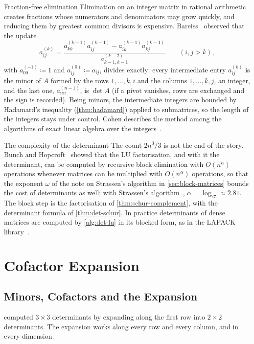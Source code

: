 \begin{note}{Fraction-free elimination}
Elimination on an integer matrix in rational arithmetic creates fractions whose numerators and denominators may grow quickly, and reducing them by greatest common divisors is expensive. Bareiss~\cite{bareiss1968} observed that the update
\[
a_{ij}^{(k)}=\frac{a_{kk}^{(k-1)}a_{ij}^{(k-1)}-a_{ik}^{(k-1)}a_{kj}^{(k-1)}}{a_{k-1,k-1}^{(k-2)}}\qquad(i,j>k),
\]
with $a_{00}^{(-1)}\coloneqq1$ and $a_{ij}^{(0)}\coloneqq a_{ij}$, divides exactly: every intermediate entry $a_{ij}^{(k)}$ is the minor of $A$ formed by the rows $1,\ldots,k,i$ and the columns $1,\ldots,k,j$, an integer, and the last one, $a_{nn}^{(n-1)}$, is $\det A$ (if a pivot vanishes, rows are exchanged and the sign is recorded). Being minors, the intermediate integers are bounded by Hadamard's inequality (\cref{thm:hadamard}) applied to submatrices, so the length of the integers stays under control. Cohen describes the method among the algorithms of exact linear algebra over the integers~\cite{cohen1993}.
\end{note}

\begin{note}{The complexity of the determinant}
The count $2n^3/3$ is not the end of the story. Bunch and Hopcroft~\cite{bunch1974} showed that the LU factorisation, and with it the determinant, can be computed by recursive block elimination with $O(n^\alpha)$ operations whenever matrices can be multiplied with $O(n^\alpha)$ operations, so that the exponent $\omega$ of the note on Strassen's algorithm in \cref{sec:block-matrices} bounds the cost of determinants as well; with Strassen's algorithm~\cite{strassen1969}, $\alpha=\log_27\approx2.81$. The block step is the factorisation of \cref{thm:schur-complement}, with the determinant formula of \cref{thm:det-schur}. In practice determinants of dense matrices are computed by \cref{alg:det-lu} in its blocked form, as in the LAPACK library~\cite{golub2013}.
\end{note}

\section{Cofactor Expansion}
\label{sec:cofactor}

\subsection{Minors, Cofactors and the Expansion}

 computed $3\times3$ determinants by expanding along the first row into $2\times2$ determinants. The expansion works along every row and every column, and in every dimension.

